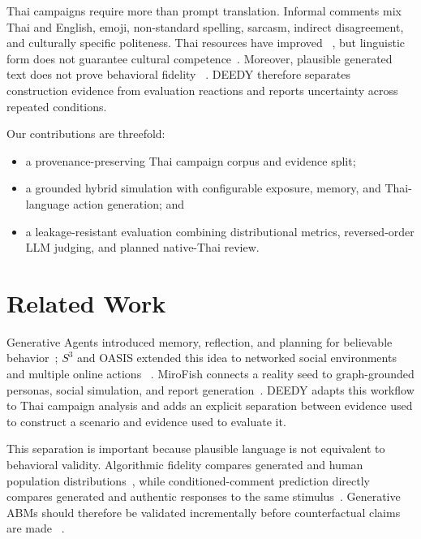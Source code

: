 \documentclass[conference]{IEEEtran}
\begin{document}
Thai campaigns require more than prompt translation. Informal comments mix Thai
and English, emoji, non-standard spelling, sarcasm, indirect disagreement, and
culturally specific politeness. Thai resources have improved
~\cite{arreerard2022survey,lowphansirikul2021wangchanberta,
pipatanakul2024typhoon2}, but linguistic form
does not guarantee cultural competence~\cite{kim2025thaicli}. Moreover,
plausible generated text does not prove behavioral fidelity
~\cite{argyle2023out,schwager2026conditioned}. DEEDY
therefore separates construction evidence from evaluation reactions and
reports uncertainty across repeated conditions.

Our contributions are threefold:
\begin{itemize}
    \item a provenance-preserving Thai campaign corpus and evidence split;
    \item a grounded hybrid simulation with configurable exposure, memory, and
    Thai-language action generation; and
    \item a leakage-resistant evaluation combining distributional metrics,
    reversed-order LLM judging, and planned native-Thai review.
\end{itemize}

\section{Related Work}

Generative Agents introduced memory, reflection, and planning for believable
behavior~\cite{park2023generative}; $S^3$ and OASIS extended this idea to
networked social environments and multiple online actions
~\cite{gao2023s3,yang2024oasis}. MiroFish connects a
reality seed to graph-grounded personas, social simulation, and report
generation~\cite{mirofish2026}. DEEDY adapts this workflow to Thai campaign
analysis and adds an explicit separation between evidence used to construct a
scenario and evidence used to evaluate it.

This separation is important because plausible language is not equivalent to
behavioral validity. Algorithmic fidelity compares generated and human
population distributions~\cite{argyle2023out}, while conditioned-comment
prediction directly compares generated and authentic responses to the same
stimulus~\cite{schwager2026conditioned}. Generative ABMs should therefore be
validated incrementally before counterfactual claims are made
~\cite{cross2025validating}.
\end{document}
